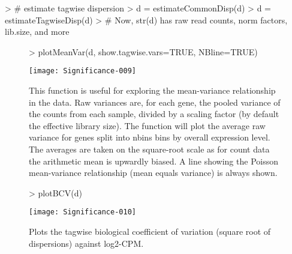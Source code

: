 \documentclass{article}
\begin{document}
\begin{Schunk}
\begin{Sinput}
> # estimate tagwise dispersion
> d = estimateCommonDisp(d)
> d = estimateTagwiseDisp(d)
> # Now, str(d) has raw read counts, norm factors, lib.size, and more
\end{Sinput}
\end{Schunk}

\begin{figure}[H]
\centering
\begin{Schunk}
\begin{Sinput}
> plotMeanVar(d, show.tagwise.vars=TRUE, NBline=TRUE)
\end{Sinput}
\end{Schunk}
\texttt{[image: Significance-009]}
\caption{This function is useful for exploring the mean-variance relationship in the data. Raw variances are, for each gene, the pooled variance of the counts from each sample, divided by a scaling factor (by default the effective library size). The function will plot the average raw variance for genes split into nbins bins by overall expression level. The averages are taken on the square-root scale as for count data the arithmetic mean is upwardly biased. A line showing the Poisson mean-variance relationship (mean equals variance) is always shown.}
\label{plotMeanVar}
\end{figure}

\begin{figure}[H]
\centering
\begin{Schunk}
\begin{Sinput}
> plotBCV(d)
\end{Sinput}
\end{Schunk}
\texttt{[image: Significance-010]}
\caption{Plots the tagwise biological coefficient of variation (square root of dispersions) against log2-CPM.}
\label{plotBCV}
\end{figure}
\end{document}
